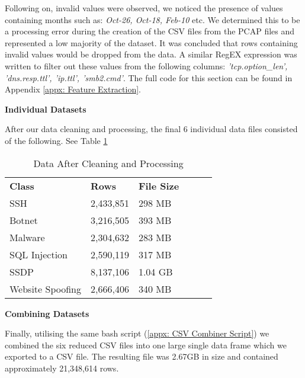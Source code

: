 \smallskip
Following on, invalid values were observed, we noticed the presence of values containing months such as: \textit{Oct-26, Oct-18, Feb-10} etc. We determined this to be a processing error during the creation of the CSV files from the PCAP files and represented a low majority of the dataset. It was concluded that rows containing invalid values would be dropped from the data. A similar RegEX expression was written to filter out these values from the following columns: \textit{'tcp.option\_len', 'dns.resp.ttl', 'ip.ttl', 'smb2.cmd'}. The full code for this section can be found in Appendix \ref{appx: Feature Extraction}.

\medskip

\textbf{Individual Datasets}

\smallskip
After our data cleaning and processing, the final 6 individual data files consisted of the following. See Table \ref{tab:reduced_data}

\begin{table}[H]
\centering
\begin{tabular}{llllll}
\cline{1-3}
\textbf{Class}  & \textbf{Rows} & \textbf{File Size} &  &  &  \\ \cline{1-3}
SSH              & 2,433,851    & 298 MB               &  &  &  \\
Botnet           & 3,216,505     & 393 MB             &  &  &  \\
Malware          & 2,304,632     & 283 MB             &  &  &  \\
SQL Injection    & 2,590,119     & 317 MB             &  &  &  \\
SSDP             & 8,137,106     & 1.04 GB            &  &  &  \\
Website Spoofing & 2,666,406     & 340 MB            &  &  &  \\ \cline{1-3}
\end{tabular}
\caption{Data After Cleaning and Processing}
\label{tab:reduced_data}
\end{table}

\medskip

\textbf{Combining Datasets}

\smallskip
Finally, utilising the same bash script (\ref{appx: CSV Combiner Script}) we combined the six reduced CSV files into one large single data frame which we exported to a CSV file. The resulting file was 2.67GB in size and contained approximately 21,348,614 rows. 